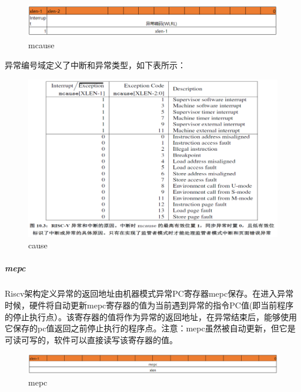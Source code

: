 \begin{figure}[H] %
    \centering %
    \includegraphics[width=1.0\textwidth]{figs/mcause.png} %
    \caption{mcause} %
    \label{Fig.4} %
\end{figure}

异常编号域定义了中断和异常类型，如下表所示：

\begin{figure}[H] %
    \centering %
    \includegraphics[width=1.0\textwidth]{figs/cause.png} %
    \caption{cause} %
    \label{Fig.5} %
\end{figure}

\subparagraph{mepc}
Riscv架构定义异常的返回地址由机器模式异常PC寄存器mepc保存。在进入异常时候，硬件将自动更新mepc寄存器的值为当前遇到异常的指令PC值(即当前程序的停止执行点）。该寄存器的值将作为异常的返回地址，在异常结束后，能够使用它保存的pc值返回之前停止执行的程序点。注意：mepc虽然被自动更新，但它是可读可写的，软件可以直接读写该寄存器的值。

\begin{figure}[H] %
    \centering %
    \includegraphics[width=1.0\textwidth]{figs/mepc.png} %
    \caption{mepc} %
    \label{Fig.6} %
\end{figure}

